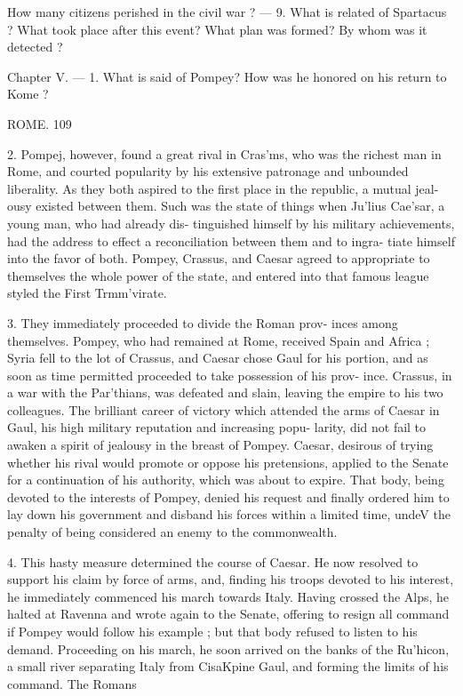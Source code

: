 \documentclass[openany,a4paper]{memoir}
\begin{document}
How many citizens perished in the civil war ? — 9. What is related of 
Spartacus ? What took place after this event? What plan was formed? 
By whom was it detected ? 

Chapter V. — 1. What is said of Pompey? How was he honored 
on his return to Kome ? 



ROME. 109 

2. Pompej, however, found a great rival in Cras'ms, 
who was the richest man in Rome, and courted popularity 
by his extensive patronage and unbounded liberality. As they 
both aspired to the first place in the republic, a mutual jeal- 
ousy existed between them. Such was the state of things 
when Ju'lius Cae'sar, a young man, who had already dis- 
tinguished himself by his military achievements, had the 
address to effect a reconciliation between them and to ingra- 
tiate himself into the favor of both. Pompey, Crassus, and 
Caesar agreed to appropriate to themselves the whole power 
of the state, and entered into that famous league styled the 
First Trmm'virate. 

3. They immediately proceeded to divide the Roman prov- 
inces among themselves. Pompey, who had remained at 
Rome, received Spain and Africa ; Syria fell to the lot of 
Crassus, and Caesar chose Gaul for his portion, and as soon 
as time permitted proceeded to take possession of his prov- 
ince. Crassus, in a war with the Par'thians, was defeated 
and slain, leaving the empire to his two colleagues. The 
brilliant career of victory which attended the arms of Caesar 
in Gaul, his high military reputation and increasing popu- 
larity, did not fail to awaken a spirit of jealousy in the breast 
of Pompey. Caesar, desirous of trying whether his rival 
would promote or oppose his pretensions, applied to the 
Senate for a continuation of his authority, which was about 
to expire. That body, being devoted to the interests of 
Pompey, denied his request and finally ordered him to lay 
down his government and disband his forces within a limited 
time, undeV the penalty of being considered an enemy to the 
commonwealth. 

4. This hasty measure determined the course of Caesar. 
He now resolved to support his claim by force of arms, and, 
finding his troops devoted to his interest, he immediately 
commenced his march towards Italy. Having crossed the 
Alps, he halted at Ravenna and wrote again to the Senate, 
offering to resign all command if Pompey would follow his 
example ; but that body refused to listen to his demand. 
Proceeding on his march, he soon arrived on the banks of 
the Ru'hicon, a small river separating Italy from CisaKpine 
Gaul, and forming the limits of his command. The Romans 
\end{document}
